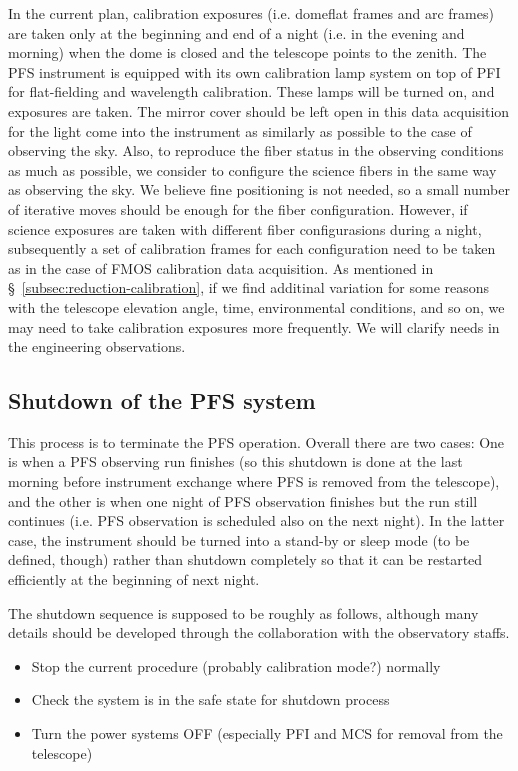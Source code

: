 \documentclass[a4paper]{article}
\begin{document}
In the current plan, calibration exposures (i.e. domeflat frames and
arc frames) are taken only at the beginning and end of a night
(i.e. in the evening and morning) when the dome is closed and the
telescope points to the zenith. The PFS instrument is equipped with
its own calibration lamp system on top of PFI for flat-fielding and
wavelength calibration. These lamps will be turned on, and exposures
are taken. The mirror cover should be left open in this data
acquisition for the light come into the instrument as similarly as
possible to the case of observing the sky. Also, to reproduce the
fiber status in the observing conditions as much as possible, we
consider to configure the science fibers in the same way as observing
the sky. We believe fine positioning is not needed, so a small number
of iterative moves should be enough for the fiber configuration.
However, if science exposures are taken with different fiber
configurasions during a night, subsequently a set of calibration
frames for each configuration need to be taken as in the case of FMOS
calibration data acquisition. As mentioned in
\S~\ref{subsec:reduction-calibration}, if we find additinal variation
for some reasons with the telescope elevation angle, time,
environmental conditions, and so on, we may need to take calibration
exposures more frequently. We will clarify needs in the engineering
observations.

\subsection{Shutdown of the PFS system}

This process is to terminate the PFS operation. Overall there are two
cases: One is when a PFS observing run finishes (so this shutdown is
done at the last morning before instrument exchange where PFS is
removed from the telescope), and the other is when one night of PFS
observation finishes but the run still continues (i.e. PFS observation
is scheduled also on the next night). In the latter case, the
instrument should be turned into a stand-by or sleep mode (to be
defined, though) rather than shutdown completely so that it can be
restarted efficiently at the beginning of next night.

The shutdown sequence is supposed to be roughly as follows, although
many details should be developed through the collaboration with the
observatory staffs.

\begin{itemize}
\item Stop the current procedure (probably calibration mode?) normally
\item Check the system is in the safe state for shutdown process
\item Turn the power systems OFF (especially PFI and MCS for removal from the telescope)
\end{itemize}
\end{document}
